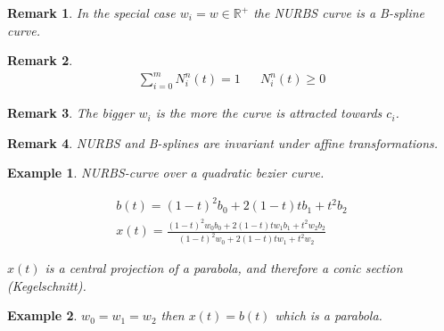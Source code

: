 \documentclass[]{article}
\newtheorem{example}{Example}
\newtheorem{remark}{Remark}
\begin{document}
\begin{remark}
	In the special case $w_i = w \in \mathbb{R}^+$ the NURBS curve is a B-spline curve.
\end{remark}

\begin{remark}
	\begin{align*}
		\sum_{i=0}^{m} N_i^n(t) = 1 && N_i^n(t) \geq 0
	\end{align*}
\end{remark}

\begin{remark}
	The bigger $w_i$ is the more the curve is attracted towards $c_i$.
\end{remark}

\begin{remark}
	NURBS and B-splines are invariant under affine transformations.
\end{remark}

\begin{example}
	NURBS-curve over a quadratic bezier curve.
	
	\begin{align*}
		b(t) = (1-t)^2b_0 + 2(1-t)tb_1 + t^2b_2\\
		x(t) = \frac{(1-t)^2w_0b_0 + 2(1-t)tw_1b_1 + t^2w_2b_2}{(1-t)^2w_0 + 2(1-t)tw_1 + t^2w_2}
	\end{align*}
	
	$x(t)$ is a central projection of a parabola, and therefore a conic section (Kegelschnitt).
\end{example}

\begin{example}
	$w_0 = w_1 = w_2$ then $x(t) = b(t)$ which is a parabola.
\end{example}
\end{document}
